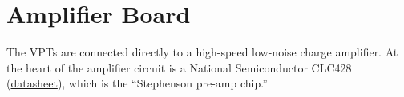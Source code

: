 
\section{Amplifier Board}
\label{sec:eq_preamp}

The \glspl{VPT} are connected directly to a high-speed low-noise charge amplifier.  At the heart of the amplifier circuit is a {National Semiconductor CLC428} (\href{papers/CLC428}{datasheet}), which is the ``Stephenson pre-amp chip.''


